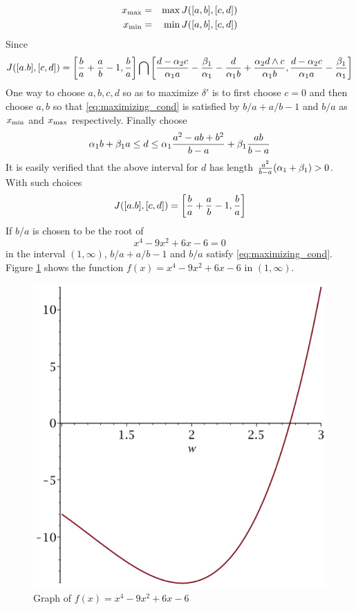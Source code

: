 \documentclass{article}
\theoremstyle{remark}
\begin{document}
\begin{eqnarray*}
  x_{\text{max}} &=& \max J([a, b], [c ,d]) \\
  x_{\text{min}} &=& \min J([a, b], [c ,d])
\end{eqnarray*}
Since
\[
J([a. b], [c, d]) =
\left[
  {b \over a} + {a \over b} - 1, {b \over a}
\right] \bigcap \left[
  {d - \alpha_2 c \over \alpha_1 a} - {\beta_1 \over \alpha_1} -
  {d \over \alpha_1 b} + {\alpha_2 d \wedge c \over \alpha_1 b},
  {d - \alpha_2 c \over \alpha_1 a} - {\beta_1 \over \alpha_1}  
\right]
\]
One way to choose $a, b, c, d$ so as to maximize $\delta'$ is to first
choose $c = 0$ and then choose $a, b$ so that
\eqref{eq:maximizing_cond} is satisfied by $b/a + a/b - 1$ and $b/a$
as $x_{\text{min}}$ and $x_{\text{max}}$ respectively. Finally choose
\[
  \alpha_1 b + \beta_1 a
  \leq
  d
  \leq
  \alpha_1 {
    a^2 - ab + b^2
    \over
    b - a
  } +
  \beta_1 {
    ab \over b - a
  }
\]
It is easily verified that the above interval for $d$ has length
${a^2 \over b - a} (\alpha_1 + \beta_1) > 0$. With such choices
\[
J([a. b], [c, d]) =
\left[
  {b \over a} + {a \over b} - 1, {b \over a}
\right]
\]
If $b/a$ is chosen to be the root of
\[
x^4 - 9x^2 + 6x - 6 = 0
\]
in the interval $(1, \infty)$, $b/a + a/b - 1$ and $b/a$ satisfy
\eqref{eq:maximizing_cond}. Figure \ref{fig:A} shows the function
$f(x) = x^4 - 9x^2 + 6x - 6$ in $(1, \infty)$.
\begin{figure}[htb!]
  \centering
  \includegraphics[scale=0.4]{argmax_b_over_a.pdf}
  \caption{Graph of $f(x) = x^4 - 9x^2 + 6x - 6$}
  \label{fig:A}
\end{figure}


\end{document}
